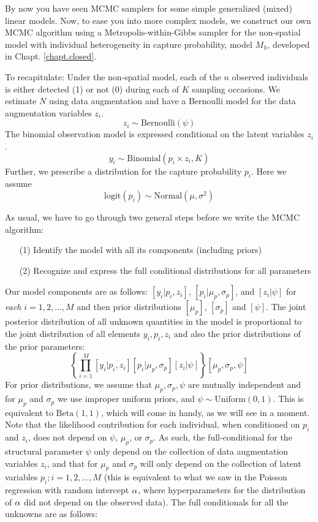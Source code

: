 By now you have seen MCMC samplers for some simple generalized (mixed) linear models. Now, to
ease you into more complex models, we construct our own MCMC algorithm
using a Metropolis-within-Gibbs sampler for the non-spatial model with
individual heterogeneity in capture probability, model $M_{h}$, developed in
Chapt. \ref{chapt.closed}.

To recapitulate: Under the non-spatial model, each of the $n$ observed
individuals is either detected (1) or not (0) during each of $K$
sampling occasions. We estimate $N$ using data augmentation and have a
Bernoulli model for the data augmentation variables $z_{i}$.
\[
z_{i} \sim \mbox{Bernoulli}(\psi)
\]
The binomial
observation model is expressed conditional on the latent variables
$z_{i}$.
\[
y_i \sim \mbox{Binomial} (p_i \times z_i, K)
\]
Further, we prescribe a distribution for the capture
probability $p_{i}$. Here we assume
\[
\mathrm{logit}(p_{i}) \sim \mbox{Normal}(\mu,\sigma^2)
\]

As usual, we have to go through two general steps before we write the MCMC algorithm:
\begin{itemize}
\item[  (1)] Identify the model with all its components (including
    priors)
\item[  (2)] Recognize and express the full conditional distributions for
    all parameters
\end{itemize}
Our model components are as follows: $[y_{i}| p_{i},z_{i}]$,
$[p_{i}|\mu_{p},\sigma_{p}]$, and $[z_{i}|\psi]$
for {\it each} $i=1,2,\ldots,M$ and then prior distributions
$[\mu_{p}]$, $[\sigma_{p}]$ and $[\psi]$.
The joint posterior distribution of all unknown quantities in the model
is proportional to the joint distribution of all elements
$y_{i},p_{i},z_{i}$ and also the prior distributions of the prior parameters:
\[
\left\{ \prod_{i=1}^{M} [y_{i}|p_{i},z_{i}][p_{i}|\mu_{p},\sigma_{p}]
[z_{i}|\psi] \right\} [\mu_{p},\sigma_{p},\psi]
\]
For prior distributions, we assume that $\mu_{p},\sigma_{p}, \psi$ are
mutually independent and for $\mu_{p}$ and $\sigma_{p}$ we use
improper uniform priors, and $\psi \sim \mbox{Uniform}(0,1)$.  This is
equivalent to $\mbox{Beta}(1,1)$, which will come in handy, as we will
see in a moment. Note that the likelihood contribution for each
individual, when conditioned on $p_{i}$ and $z_{i}$, does not depend
on $\psi$, $\mu_{p}$, or $\sigma_{p}$.  As such, the full-conditional
for the structural parameter $\psi$ only depend on the collection of
data augmentation variables $z_{i}$, and that for $\mu_{p}$ and
$\sigma_{p}$ will only depend on the collection of latent variables
$p_{i}; i=1,2,\ldots,M$ (this is equivalent to what we saw in the Poisson regression with random intercept ${\bf \alpha}$, where hyperparameters for the distribution of ${\bf \alpha}$ did not depend on the observed data).
The full conditionals for all the unknowns
are as follows:

